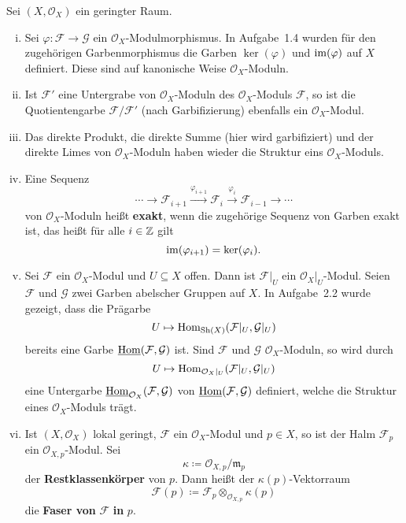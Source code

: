 \begin{bem}
	Sei $(X, \mathcal{O}_X)$ ein geringter Raum.
	\begin{enumerate}[i)]
		\item Sei $\varphi\colon \mathcal{F} \to \mathcal{G}$ ein $\mathcal{O}_X$-Modulmorphismus. In Aufgabe~1.4 wurden für den zugehörigen Garbenmorphismus die Garben $\ker(\varphi)$ und $\operatorname{im}(\varphi)$ auf $X$ definiert. Diese sind auf kanonische Weise $\mathcal{O}_X$-Moduln.
		\item Ist $\mathcal{F}'$ eine Untergrabe von $\mathcal{O}_X$-Moduln des $\mathcal{O}_X$-Moduls $\mathcal{F}$, so ist die Quotientengarbe $\mathcal{F}/\mathcal{F}'$ (nach Garbifizierung) ebenfalls ein $\mathcal{O}_X$-Modul.
		\item Das direkte Produkt, die direkte Summe (hier wird garbifiziert) und der direkte Limes von $\mathcal{O}_X$-Moduln haben wieder die Struktur eins $\mathcal{O}_X$-Moduls.
		\item Eine Sequenz
		\[
			\cdots \to \mathcal{F}_{i+1} \overset{\varphi_{i+1}}{\to} \mathcal{F}_i \overset{\varphi_{i}}{\to} \mathcal{F}_{i-1} \to \cdots
		\]
		von $\mathcal{O}_X$-Moduln heißt \textbf{exakt}, wenn die zugehörige Sequenz von Garben exakt ist, das heißt für alle $i \in \mathbb {Z}$ gilt
		\[
			\operatorname{im}(\varphi_{i+1}) =  \ker(\varphi_i).
		\]
		\item Sei $\mathcal{F}$ ein $\mathcal{O}_X$-Modul und $U \subseteq X$ offen. Dann ist $\mathcal{F}\vert_U$ ein $\mathcal{O}_X\vert_U$-Modul. Seien $\mathcal{F}$ und $\mathcal{G}$ zwei Garben abelscher Gruppen auf $X$. In Aufgabe~2.2 wurde gezeigt, dass die Prägarbe
		\[
			U \mapsto \operatorname{Hom}_{\operatorname{Sh}(X)}(\mathcal{F}\vert_U,\mathcal{G}\vert_U)
		\]
		bereits eine Garbe $\underline{\operatorname{Hom}}(\mathcal{F},\mathcal{G})$ ist. Sind $\mathcal{F}$ und $\mathcal{G}$ $\mathcal{O}_X$-Moduln, so wird durch
		\[
			U \mapsto \operatorname{Hom}_{\mathcal{O}_X\vert_U}(\mathcal{F}\vert_U,\mathcal{G}\vert_U)
		\]
		eine Untergarbe $\underline{\operatorname{Hom}}_{\mathcal{O}_X}(\mathcal{F},\mathcal{G})$ von $\underline{\operatorname{Hom}}(\mathcal{F},\mathcal{G})$ definiert, welche die Struktur eines $\mathcal{O}_X$-Moduls trägt.
		\item Ist $(X, \mathcal{O}_X)$ lokal geringt, $\mathcal{F}$ ein $\mathcal{O}_X$-Modul und $p\in X$, so ist der Halm $\mathcal{F}_p$ ein $\mathcal{O}_{X,p}$-Modul. Sei
		\[
			\kappa \coloneqq \mathcal{O}_{X,p}/\mathfrak{m}_p
		\]
		der \textbf{Restklassenkörper} von $p$. Dann heißt der $\kappa(p)$-Vektorraum
		\[
			\mathcal{F}(p) \coloneqq \mathcal{F}_p \otimes_{\mathcal{O}_{X,p}} \kappa(p)
		\]
		die \textbf{Faser von} $\mathcal{F}$ \textbf{in} $p$.
	\end{enumerate}
\end{bem}

